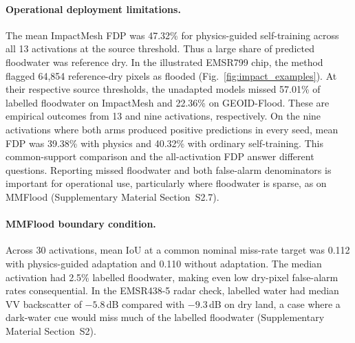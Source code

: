 \documentclass[a4paper,fleqn]{cas-sc}
\begin{document}
\paragraph{Operational deployment limitations.} The mean ImpactMesh FDP was 47.32\% for physics-guided self-training across all 13 activations at the source threshold. Thus a large share of predicted floodwater was reference dry. In the illustrated EMSR799 chip, the method flagged 64,854 reference-dry pixels as flooded (Fig.~\ref{fig:impact_examples}). At their respective source thresholds, the unadapted models missed 57.01\% of labelled floodwater on ImpactMesh and 22.36\% on GEOID-Flood. These are empirical outcomes from 13 and nine activations, respectively. On the nine activations where both arms produced positive predictions in every seed, mean FDP was 39.38\% with physics and 40.32\% with ordinary self-training. This common-support comparison and the all-activation FDP answer different questions. Reporting missed floodwater and both false-alarm denominators is important for operational use, particularly where floodwater is sparse, as on MMFlood (Supplementary Material Section~S2.7).

\paragraph{MMFlood boundary condition.} Across 30 activations, mean IoU at a common nominal miss-rate target was 0.112 with physics-guided adaptation and 0.110 without adaptation. The median activation had 2.5\% labelled floodwater, making even low dry-pixel false-alarm rates consequential. In the EMSR438-5 radar check, labelled water had median VV backscatter of $-5.8$\,dB compared with $-9.3$\,dB on dry land, a case where a dark-water cue would miss much of the labelled floodwater (Supplementary Material Section~S2).
\end{document}
